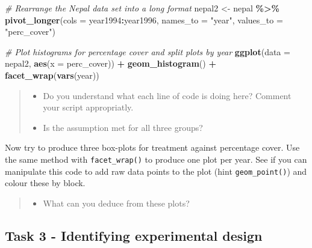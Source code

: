 \documentclass[
]{book}
\newenvironment{Shaded}{\begin{snugshade}}{\end{snugshade}}
\newcommand{\AttributeTok}[1]{\textcolor[rgb]{0.13,0.29,0.53}{#1}}
\newcommand{\CommentTok}[1]{\textcolor[rgb]{0.56,0.35,0.01}{\textit{#1}}}
\newcommand{\FunctionTok}[1]{\textcolor[rgb]{0.13,0.29,0.53}{\textbf{#1}}}
\newcommand{\NormalTok}[1]{#1}
\newcommand{\OtherTok}[1]{\textcolor[rgb]{0.56,0.35,0.01}{#1}}
\newcommand{\SpecialCharTok}[1]{\textcolor[rgb]{0.81,0.36,0.00}{\textbf{#1}}}
\newcommand{\StringTok}[1]{\textcolor[rgb]{0.31,0.60,0.02}{#1}}
\providecommand{\tightlist}{%
  \setlength{\itemsep}{0pt}\setlength{\parskip}{0pt}}
\begin{document}
\begin{Shaded}
\begin{Highlighting}[]
\CommentTok{\# Rearrange the Nepal data set into a long format}
\NormalTok{nepal2 }\OtherTok{\textless{}{-}}\NormalTok{ nepal }\SpecialCharTok{\%\textgreater{}\%}
  \FunctionTok{pivot\_longer}\NormalTok{(}\AttributeTok{cols =}\NormalTok{ year1994}\SpecialCharTok{:}\NormalTok{year1996,}
               \AttributeTok{names\_to =} \StringTok{"year"}\NormalTok{, }
               \AttributeTok{values\_to =} \StringTok{"perc\_cover"}\NormalTok{)}

\CommentTok{\# Plot histograms for percentage cover and split plots by year}
\FunctionTok{ggplot}\NormalTok{(}\AttributeTok{data =}\NormalTok{ nepal2, }\FunctionTok{aes}\NormalTok{(}\AttributeTok{x =}\NormalTok{ perc\_cover)) }\SpecialCharTok{+}
  \FunctionTok{geom\_histogram}\NormalTok{() }\SpecialCharTok{+}
  \FunctionTok{facet\_wrap}\NormalTok{(}\FunctionTok{vars}\NormalTok{(year))}
\end{Highlighting}
\end{Shaded}

\begin{quote}
\begin{itemize}
\tightlist
\item
  Do you understand what each line of code is doing here? Comment your script appropriatly.
\item
  Is the assumption met for all three groups?
\end{itemize}
\end{quote}

Now try to produce three box-plots for treatment against percentage cover. Use the same method with \texttt{facet\_wrap()} to produce one plot per year. See if you can manipulate this code to add raw data points to the plot (hint \texttt{geom\_point()}) and colour these by block.

\begin{quote}
\begin{itemize}
\tightlist
\item
  What can you deduce from these plots?
\end{itemize}
\end{quote}

\hypertarget{c12t3}{%
\subsection{Task 3 - Identifying experimental design}\label{c12t3}}
\end{document}
